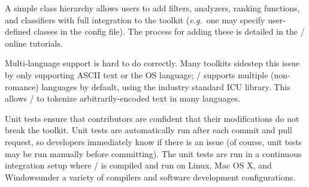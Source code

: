 A simple class hierarchy allows users to add filters, analyzers, ranking
functions, and classifiers with full integration to the toolkit
(\emph{e.g.}\ one
may specify user-defined classes in the config file). The process for adding
these is detailed in the \meta/ online tutorials.

Multi-language support is hard to do correctly. Many toolkits sidestep this
issue by only supporting ASCII text or the OS language; \meta/ supports multiple
(non-romance) languages by default, using the industry standard ICU
library\footnotemark[4]. This allows \meta/ to tokenize arbitrarily-encoded text
in many languages.


Unit tests ensure that contributors are confident that their modifications do
not break the toolkit. Unit tests are automatically run after each commit and
pull request, so developers immediately know if there is an issue (of course,
unit tests may be run manually before committing). The unit tests are run in a
continuous integration setup where \meta/ is compiled and run on
Linux\footnotemark[77], Mac OS X\footnotemark[77], and Windows\footnotemark[78]
under a variety of compilers and software development configurations.

